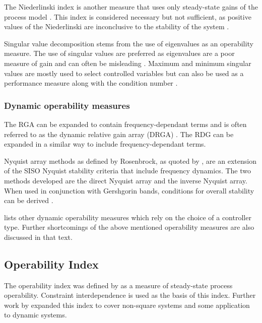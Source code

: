 The Niederlinski index is another measure that uses only steady-state gains of the process model \citep[572-573]{luyben}. 
This index is considered necessary but not sufficient, as positive values of the Niederlinski are inconclusive to the stability of the system \citep[445]{skogestad}.

Singular value decomposition stems from the use of eigenvalues as an operability measure. 
The use of singular values are preferred as eigenvalues are a poor
measure of gain and can often be misleading \citep[75]{skogestad}.
Maximum and minimum singular values are mostly used to select controlled variables but can also be used as a performance measure along with the condition number .

\subsubsection{Dynamic operability measures}
The RGA can be expanded to contain frequency-dependant terms and is often referred to as the dynamic relative gain array (DRGA) \citep[637]{marlin}. 
The RDG \citep{artrdg} can be expanded in a similar way to include frequency-dependant terms.

Nyquist array methods as defined by Rosenbrock, as quoted by \citet[92]{skogestad}, are an extension of the SISO Nyquist stability criteria that include frequency dynamics. 
The two methods developed are the direct Nyquist array and the inverse Nyquist array. 
When used in conjunction with Gershgorin bands, conditions for overall stability can be derived \citep[440]{skogestad}.

\citet{vinsonphd} lists other dynamic operability measures which rely on the choice of a controller type. Further shortcomings of the above mentioned operability measures are also discussed in that text. 

\subsection{Operability Index}\label{sec:oi}
The operability index was defined by \citet{vinsonphd} as a measure of steady-state process operability. 
Constraint interdependence is used as the basis of this index. 
Further work by \citet{limaphd} expanded this index to cover non-square systems and some application to dynamic systems.
